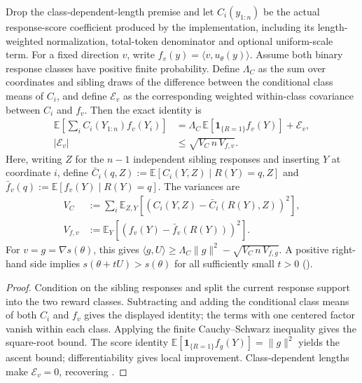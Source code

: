 \begin{proposition}
\label{prop:binary-length-covariance}
Drop the class-dependent-length premise and let $C_i(y_{1:n})$ be the actual
response-score coefficient produced by the implementation, including its
length-weighted normalization, total-token denominator and optional
uniform-scale term. For a fixed direction $v$, write
$f_v(y)=\langle v,u_\theta(y)\rangle$. Assume both binary response classes
have positive finite probability. Define $\Lambda_C$ as the sum over
coordinates and sibling draws of the difference between the conditional
class means of $C_i$, and define
$\mathcal E_v$ as the corresponding weighted within-class covariance between
$C_i$ and $f_v$. Then the exact identity is
\begin{align*}
 \mathbb E\!\left[\sum_i C_i(Y_{1:n})f_v(Y_i)\right]
   &= \Lambda_C\,\mathbb E[\mathbf 1_{\{R=1\}}f_v(Y)] + \mathcal E_v,\\
 |\mathcal E_v|&\le\sqrt{V_C\,n\,V_{f,v}}.
\end{align*}
Here, writing $Z$ for the $n-1$ independent sibling responses and inserting
$Y$ at coordinate $i$, define
$\bar C_i(q,Z):=\mathbb E[C_i(Y,Z)\mid R(Y)=q,Z]$ and
$\bar f_v(q):=\mathbb E[f_v(Y)\mid R(Y)=q]$. The variances are
\begin{align*}
 V_C&:=\sum_i\mathbb E_{Z,Y}
       [(C_i(Y,Z)-\bar C_i(R(Y),Z))^2],\\
 V_{f,v}&:=\mathbb E_Y[(f_v(Y)-\bar f_v(R(Y)))^2].
\end{align*}
For $v=g=\nabla s(\theta)$, this gives
$\langle g,U\rangle\ge\Lambda_C\|g\|^2-\sqrt{V_C\,n\,V_{f,g}}$.
A positive right-hand side implies $s(\theta+tU)>s(\theta)$ for all
sufficiently small $t>0$ ().
\end{proposition}

\begin{proof}
Condition on the sibling responses and split the current response support
into the two reward classes. Subtracting and adding the conditional class
means of both $C_i$ and $f_v$ gives the displayed identity; the terms with
one centered factor vanish within each class. Applying the finite
Cauchy--Schwarz inequality gives the square-root bound. The score identity
$\mathbb E[\mathbf 1_{\{R=1\}}f_g(Y)]=\|g\|^2$ yields the ascent bound;
differentiability gives local improvement. Class-dependent lengths make
$\mathcal E_v=0$, recovering .
\end{proof}
